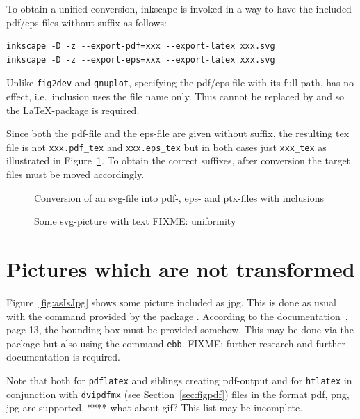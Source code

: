 \documentclass[12pt]{book}
\newcommand{\gls}[1]{#1}
\begin{document}
To obtain a unified conversion, 
inkscape is invoked in a way to have the included pdf/eps-files 
without suffix as follows: 
%
\begin{Verbatim}[fontsize=\normalsize]
inkscape -D -z --export-pdf=xxx --export-latex xxx.svg 
inkscape -D -z --export-eps=xxx --export-latex xxx.svg 
\end{Verbatim}
%
Unlike \texttt{fig2dev} and \texttt{gnuplot}, 
specifying the pdf/eps-file  with its full path, 
has no effect, i.e.~inclusion uses the file name only. 
Thus  cannot be replaced by  
and so the \LaTeX-package  is required. 

Since both the pdf-file and the eps-file are given without suffix, 
the resulting tex file is not \texttt{xxx.pdf\_tex} and \texttt{xxx.eps\_tex} 
but in both cases just \texttt{xxx\_tex} 
as illustrated in Figure~\ref{fig:svg2pdf}. 
To obtain the correct suffixes, 
after conversion the target files must be moved accordingly. 

\begin{figure}[htb]
\centering
{}
\caption{\label{fig:svg2pdf}Conversion of an svg-file 
into pdf-, eps- and ptx-files with inclusions}
\end{figure}


\begin{figure}[htb]
\centering
\caption{\label{fig:svgWithText}Some svg-picture with text FIXME\@: uniformity  }
\end{figure}


\section{Pictures which are not transformed}\label{sec:picasis}

Figure~\ref{fig:asIsJpg} shows some picture included as jpg. 
This is done as usual with the command 
provided by the package . 
According to the documentation~\cite{GraX}, page 13, 
the bounding box must be provided somehow. 
This may be done via the package  
but also using the command \texttt{ebb}. 
FIXME\@: further research and further documentation is required. 

Note that both for \texttt{pdflatex} and siblings creating pdf-output 
and for \texttt{htlatex} in conjunction with \texttt{dvipdfmx} 
(see Section~\ref{sec:figpdf}) 
files in the format pdf, \gls{png}, \gls{jpg} are supported. 
 **** what about \gls{gif}? 
This list may be incomplete. 
\end{document}
